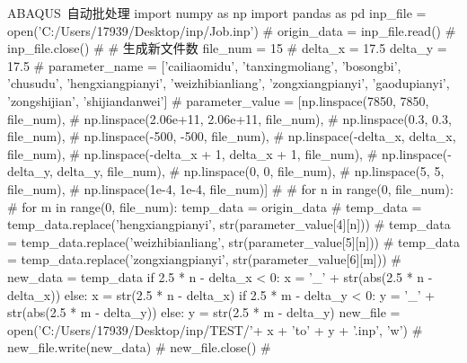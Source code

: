 \documentclass[color=orange]{textbook-cn}%
\begin{document}
\begin{PythonBox}{ABAQUS~自动批处理}
import numpy as np
import pandas as pd
inp_file = open('C:/Users/17939/Desktop/inp/Job.inp') # 
origin_data = inp_file.read() # 
inp_file.close() # 
# 生成新文件数
file_num = 15
# 
delta_x = 17.5
delta_y = 17.5
# 
parameter_name = ['cailiaomidu', 'tanxingmoliang', 'bosongbi', 
                  'chusudu', 'hengxiangpianyi', 'weizhibianliang', 
                  'zongxiangpianyi', 'gaodupianyi', 'zongshijian', 'shijiandanwei']
# 
parameter_value = [np.linspace(7850, 7850, file_num), # 
                   np.linspace(2.06e+11, 2.06e+11, file_num), # 
                   np.linspace(0.3, 0.3, file_num), # 
                   np.linspace(-500, -500, file_num), # 
                   np.linspace(-delta_x, delta_x, file_num), # 
                   np.linspace(-delta_x + 1, delta_x + 1, file_num), # 
                   np.linspace(-delta_y, delta_y, file_num), # 
                   np.linspace(0, 0, file_num), # 
                   np.linspace(5, 5, file_num), # 
                   np.linspace(1e-4, 1e-4, file_num)] # 
# 
for n in range(0, file_num): # 
    for m in range(0, file_num):
        temp_data = origin_data # 
        temp_data = temp_data.replace('hengxiangpianyi', str(parameter_value[4][n])) # 
        temp_data = temp_data.replace('weizhibianliang', str(parameter_value[5][n])) # 
        temp_data = temp_data.replace('zongxiangpianyi', str(parameter_value[6][m])) # 
        new_data = temp_data
        if 2.5 * n - delta_x < 0:
            x = '_' + str(abs(2.5 * n - delta_x))
        else:
            x = str(2.5 * n - delta_x)
        if 2.5 * m - delta_y < 0:
            y = '_' + str(abs(2.5 * m - delta_y))
        else:
            y = str(2.5 * m - delta_y)
        new_file = open('C:/Users/17939/Desktop/inp/TEST/'+ x + 'to' + y + '.inp', 'w') # 
        new_file.write(new_data) # 
        new_file.close() # 
\end{PythonBox}


\begin{Proposition*}[命题名称命题名称命题名称命题名称命题名称]
\zhlipsum[2]
\end{Proposition*}

\clearpage
{}
\lipsum

\lipsum
\end{document}
